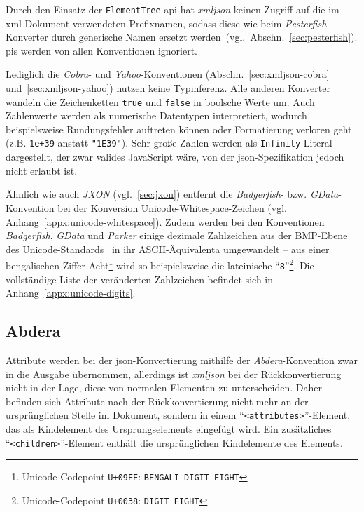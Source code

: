 Durch den Einsatz der \texttt{ElementTree}-\acrshort{api} hat \emph{xmljson} keinen Zugriff auf die im \acrshort{xml}-Dokument verwendeten Prefixnamen, sodass diese wie beim \emph{Pesterfish}-Konverter durch generische Namen ersetzt werden~(vgl.~Abschn.~\ref{sec:pesterfish}).
\glspl{pi} werden von allen Konventionen ignoriert.

Lediglich die \emph{Cobra}- und \emph{Yahoo}-Konventionen (Abschn.~\ref{sec:xmljson-cobra} und~\ref{sec:xmljson-yahoo}) nutzen keine Typinferenz. Alle anderen Konverter wandeln die Zeichenketten \texttt{true} und \texttt{false} in boolsche Werte um. Auch Zahlenwerte werden als numerische Datentypen interpretiert, wodurch beispielsweise Rundungsfehler auftreten können oder Formatierung verloren geht (z.B. \texttt{1e+39} anstatt \texttt{"1E39"}). Sehr große Zahlen werden als \texttt{Infinity}-Literal dargestellt, der zwar valides JavaScript wäre, von der \acrshort{json}-Spezifikation jedoch nicht erlaubt ist.

Ähnlich wie auch \emph{JXON} (vgl.~\ref{sec:jxon}) entfernt die \emph{Badgerfish}- bzw. \emph{GData}-Konvention bei der Konversion Unicode-Whitespace-Zeichen (vgl. Anhang~\ref{appx:unicode-whitespace}). Zudem werden bei den Konventionen \emph{Badgerfish}, \emph{GData} und \emph{Parker} einige dezimale Zahlzeichen aus der BMP-Ebene des Unicode-Standards~\cite[S.~49]{unicode9} in ihr ASCII-Äquivalenta umgewandelt -- aus einer bengalischen Ziffer Acht\footnote{Unicode-Codepoint \texttt{U+09EE}: \texttt{BENGALI DIGIT EIGHT}} wird so beispielsweise die lateinische \enquote{\texttt{8}}\footnote{Unicode-Codepoint \texttt{U+0038}: \texttt{DIGIT EIGHT}}. Die vollständige Liste der veränderten Zahlzeichen befindet sich in Anhang~\ref{appx:unicode-digits}.

\subsection{Abdera}
\label{sec:xmljson-abdera}

Attribute werden bei der \acrshort{json}-Konvertierung mithilfe der \emph{Abdera}-Konvention zwar in die Ausgabe übernommen, allerdings ist \emph{xmljson} bei der Rückkonvertierung nicht in der Lage, diese von normalen Elementen zu unterscheiden. Daher befinden sich Attribute nach der Rückkonvertierung nicht mehr an der ursprünglichen Stelle im Dokument, sondern in einem \enquote{\texttt{<attributes>}}-Element, das als Kindelement des Ursprungselements eingefügt wird. Ein zusätzliches \enquote{\texttt{<children>}}-Element enthält die ursprünglichen Kindelemente des Elements.

